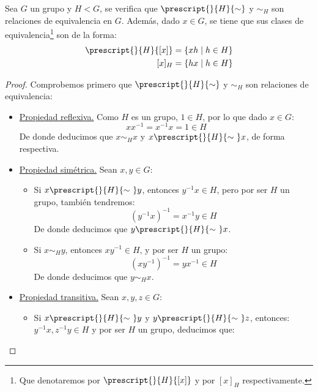 \begin{prop}
    Sea $G$ un grupo y $H < G$, se verifica que $\prescript{}{H}{\sim}$ y $\sim_H$ son relaciones de equivalencia en $G$. Además, dado $x\in G$, se tiene que sus clases de equivalencia\footnote{Que denotaremos por $\prescript{}{H}{[x]}$ y por $[x]_H$ respectivamente.} son de la forma:
    \begin{align*}
        \prescript{}{H}{[x]} &= \{xh \mid h\in H\} \\
        [x]_H &= \{hx \mid h\in H\}
    \end{align*}
    \begin{proof}
        Comprobemos primero que $\prescript{}{H}{\sim}$ y $\sim_H$ son relaciones de equivalencia:
        \begin{itemize}
            \item \underline{Propiedad reflexiva.} Como $H$ es un grupo, $1\in H$, por lo que dado $x\in G$:
                \begin{equation*}
                    xx^{-1} = x^{-1}x = 1 \in H
                \end{equation*}
                De donde deducimos que $x\sim_H x$ y $x\prescript{}{H}{\sim\ }x$, de forma respectiva.
            \item \underline{Propiedad simétrica.} Sean $x,y\in G$:
                \begin{itemize}
                    \item Si $x\prescript{}{H}{\sim\ } y$, entonces $y^{-1}x \in H$, pero por ser $H$ un grupo, también tendremos:
                        \begin{equation*}
                            {(y^{-1}x)}^{-1} = x^{-1}y \in H
                        \end{equation*}
                        De donde deducimos que $y\prescript{}{H}{\sim\ } x$.
                    \item Si $x\sim_H y$, entonces $xy^{-1}\in H$, y por ser $H$ un grupo:
                        \begin{equation*}
                            {(xy^{-1})}^{-1} = yx^{-1}\in H
                        \end{equation*}
                        De donde deducimos que $y\sim_H x$.
                \end{itemize}
            \item \underline{Propiedad transitiva.} Sean $x,y,z\in G$:
                \begin{itemize}
                    \item Si $x\prescript{}{H}{\sim\ } y$ y $y\prescript{}{H}{\sim\ } z$, entonces: $y^{-1}x, z^{-1}y \in H$ y por ser $H$ un grupo, deducimos que:

\end{itemize}
\end{itemize}
\end{proof}
\end{prop}
